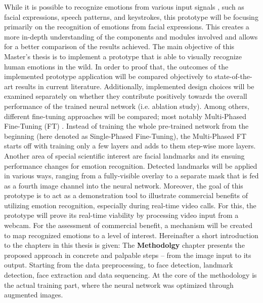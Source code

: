 While it is possible to recognize emotions from various input signals \citep{Akcay:2020:SpeechEmotionRecognition(SER)}, such as facial expressions, speech patterns, and keystrokes, this prototype will be focusing primarily on the recognition of emotions from facial expressions. This creates a more in-depth understanding of the components and modules involved and allows for a better comparison of the results achieved.
\newline\newline
The main objective of this Master's thesis is to implement a prototype that is able to visually recognize human emotions in the wild. In order to proof that, the outcomes of the implemented prototype application will be compared objectively to state-of-the-art results in current literature.
\newline\newline
Additionally, implemented design choices will be examined separately on whether they contribute positively towards the overall performance of the trained neural network (i.e. ablation study). Among others, different fine-tuning approaches will be compared; most notably Multi-Phased Fine-Tuning (FT) \citep{Sarhan:2020:MultiPhaseFineTuning}. Instead of training the whole pre-trained network from the beginning (here denoted as Single-Phased Fine-Tuning), the Multi-Phased FT starts off with training only a few layers and adds to them step-wise more layers.
\newline\newline
Another area of special scientific interest are facial landmarks and its ensuing performance changes for emotion recognition. Detected landmarks will be applied in various ways, ranging from a fully-visible overlay to a separate mask that is fed as a fourth image channel into the neural network.
\newline\newline
Moreover, the goal of this prototype is to act as a demonstration tool to illustrate commercial benefits of utilizing emotion recognition, especially during real-time video calls. For this, the prototype will prove its real-time viability by processing video input from a webcam. For the assessment of commercial benefit, a mechanism will be created to map recognized emotions to a level of interest.
\newline\newline
Hereinafter a short introduction to the chapters in this thesis is given:\newline
The \textbf{Methodolgy} chapter presents the proposed approach in concrete and palpable steps -- from the image input to its output. Starting from the data preprocessing, to face detection, landmark detection, face extraction and data sequencing. At the core of the methodology is the actual training part, where the neural network was optimized through augmented images.
